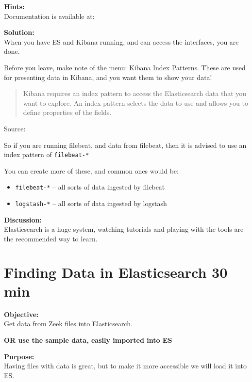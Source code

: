 \documentclass[a4paper,11pt,notitlepage]{report}
\begin{document}
{\bf Hints:}\\
Documentation is available at:\\

{\bf Solution:}\\
When you have ES and Kibana running, and can access the interfaces, you are done.

Before you leave, make note of the menu: Kibana Index Patterns. These are used for presenting data in Kibana, and you want them to show your data!

\begin{quote}
Kibana requires an index pattern to access the Elasticsearch data that you want to explore. An index pattern selects the data to use and allows you to define properties of the fields.
\end{quote}
Source: 

So if you are running filebeat, and data from filebeat, then it is advised to use an index pattern of \verb+filebeat-*+


You can create more of these, and common ones would be:
\begin{itemize}
\item \verb+filebeat-*+ -- all sorts of data ingested by filebeat
\item \verb+logstash-*+ -- all sorts of data ingested by logstash

\end{itemize}

{\bf Discussion:}\\
Elasticsearch is a huge system, watching tutorials and playing with the tools are the recommended way to learn.


\chapter{Finding Data in Elasticsearch 30 min}
\label{ex:zeek-json-es}

{\bf Objective:}\\
Get data from Zeek files into Elasticsearch.

{\bf OR use the sample data, easily imported into ES}

{\bf Purpose:}\\
Having files with data is great, but to make it more accessible we will load it into ES.
\end{document}
